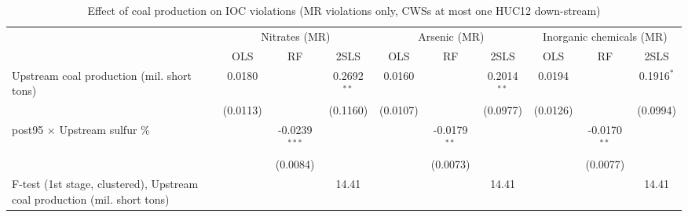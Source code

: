 
\begin{table}[htbp]
   
   \caption{\label{2sls_dwnstrm_minevio_mr_ivsumcoaltons_binvio} Effect of coal production on IOC violations (MR violations only, CWSs at most one HUC12 down-stream)}
   \bigskip
   
   \centering
   
   \begin{adjustbox}{width = \textwidth, center}
      
      
      \begin{tabular}{lccccccccc}
         \toprule
         
          & \multicolumn{3}{c}{Nitrates (MR)} & \multicolumn{3}{c}{Arsenic (MR)} & \multicolumn{3}{c}{Inorganic chemicals (MR)}\\
         
                                                                                   & OLS           & RF              & 2SLS          & OLS           & RF             & 2SLS          & OLS           & RF             & 2SLS\\  
         
         \midrule 
         Upstream coal production (mil. short tons)                                & 0.0180        &                 & 0.2692$^{**}$ & 0.0160        &                & 0.2014$^{**}$ & 0.0194        &                & 0.1916$^{*}$\\   
                                                                                   & (0.0113)      &                 & (0.1160)      & (0.0107)      &                & (0.0977)      & (0.0126)      &                & (0.0994)\\   
         post95 $\times$ Upstream sulfur \%                                        &               & -0.0239$^{***}$ &               &               & -0.0179$^{**}$ &               &               & -0.0170$^{**}$ &   \\   
                                                                                   &               & (0.0084)        &               &               & (0.0073)       &               &               & (0.0077)       &   \\   
         
         F-test (1st stage, clustered), Upstream coal production (mil. short tons) &               &                 & 14.41         &               &                & 14.41         &               &                & 14.41\\  
         

\end{tabular}
\end{adjustbox}
\end{table}
